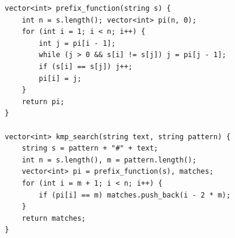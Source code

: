 
\begin{lstlisting}
vector<int> prefix_function(string s) {
    int n = s.length(); vector<int> pi(n, 0);
    for (int i = 1; i < n; i++) {
        int j = pi[i - 1];
        while (j > 0 && s[i] != s[j]) j = pi[j - 1];
        if (s[i] == s[j]) j++;
        pi[i] = j;
    }
    return pi;
}

vector<int> kmp_search(string text, string pattern) {
    string s = pattern + "#" + text;
    int n = s.length(), m = pattern.length();
    vector<int> pi = prefix_function(s), matches;
    for (int i = m + 1; i < n; i++) {
        if (pi[i] == m) matches.push_back(i - 2 * m);
    }
    return matches;
}
\end{lstlisting}
